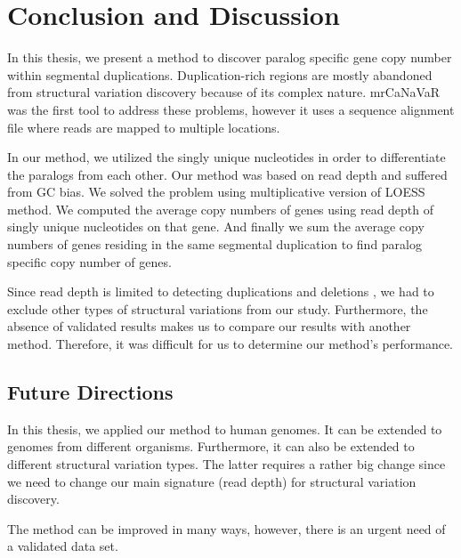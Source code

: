 \chapter{Conclusion and Discussion}
In this thesis, we present a method to discover paralog specific gene copy number within segmental duplications. Duplication-rich regions are mostly abandoned from 
structural variation discovery because of its complex nature. mrCaNaVaR was the first tool to address these problems, however it uses a sequence alignment file where reads are mapped to multiple locations. 

In our method, we utilized the singly unique nucleotides in order to differentiate the paralogs from each other. Our method was based on read depth and suffered from GC bias. We solved the problem using multiplicative version of LOESS method. We computed the average copy numbers of genes using read depth of singly unique nucleotides on that gene. And finally we sum the average copy numbers of genes residing in the same segmental duplication to find paralog specific copy number of genes.

Since read depth is limited to detecting duplications and deletions \cite{alkan2011genome}, we had to exclude other types of structural variations from our study. Furthermore, the absence of validated results makes us to compare our results with another method. Therefore, it was difficult for us to determine our method's performance. 

\section{Future Directions}

In this thesis, we applied our method to human genomes. It can be extended to genomes from different organisms. Furthermore, it can also be extended to different structural variation types. The latter requires a rather big change since we need to change our main signature (read depth) for structural variation discovery.

The method can be improved in many ways, however, there is an urgent need of a validated data set.